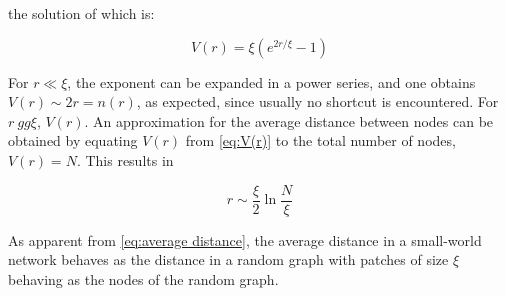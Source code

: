 \documentclass[12pt]{article}
\newcommand{\nd}{\noindent}
\begin{document}
\nd the solution of which is:

\begin{equation} \label{eq:V(r)}
    V(r) = \xi \left(e^{2r/\xi} -1\right)
\end{equation}

\nd For $r \ll \xi$, the exponent can be expanded in a power series, and one obtains $V(r) \sim 2r = n(r)$, as expected, since usually no shortcut is encountered. For $r \ gg \xi$, $V(r)$. An approximation for the average distance
between nodes can be obtained by equating $V(r)$ from \ref*{eq:V(r)} to the total number of nodes, $V(r) = N$. This results in

\begin{equation} \label{eq:average distance}
    r \sim \frac{\xi}{2} \ln \frac{N}{\xi}
\end{equation}

\nd As apparent from \ref{eq:average distance}, the average distance in a small-world network behaves as the distance in a random graph with patches of size $\xi$ behaving as the nodes of the random graph.


\clearpage


\nocite{*}
\end{document}
